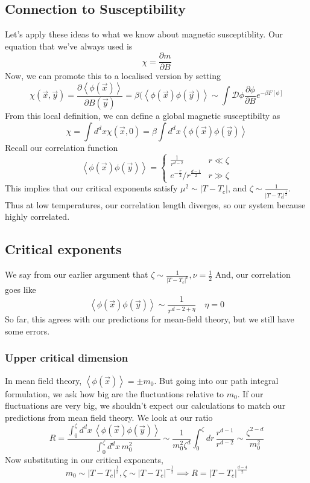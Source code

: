 \documentclass[11pt, oneside]{article}   	%
\begin{document}
\subsection{Connection to Susceptibility} 
Let's apply these ideas to what we know about magnetic susceptiblity. 
Our equation that we've always used is 
\[
 \chi = \frac{\partial  m}{\partial   B } 
\] Now, we can promote this to a localised 
version by setting 
\[
	\chi ( \vec{x}, \vec{y} ) = \frac{\partial  \left< \phi ( \vec{x} )  \right> }{\partial B ( \vec{y} ) } = \beta ( \left< \phi ( \vec{x} ) \phi ( \vec{y} )  \right> \sim \int \mathcal{ D } \phi \frac{\partial \phi }{\partial  B } e^{  - \beta F [ \phi ] }  
\] From this local 
definition, we can define a global magnetic 
susceptibilty as 
\[
	\chi = \int d^ d x \chi ( \vec{x}, 0 ) = \beta \int d^ d x \left< \phi ( \vec{x} ) \phi ( \vec{y} )  \right>
\]
Recall our correlation function 
\[
	\left< \phi ( \vec{x} ) \phi ( \vec{y} )  \right> = \begin{cases}
		\frac{1}{r^{ d - 2}  } & r \ll \zeta \\
		e^{ - \frac{r}{2 } } / r ^{ \frac{ d -1 }{ 2 } } & r \gg \zeta
	\end{cases}
\] This implies that our critical exponents satisfy $ \mu ^ 2 \sim | T - T_{ c } | $, 
and $ \zeta \sim \frac{1}{ | T - T_{ c } | ^{ \frac{1}{ 2 }  } } $. 
Thus at low temperatures, our correlation length diverges, so 
our system because highly correlated. 

\subsection{Critical exponents} 
We say from our earlier argument that $ \zeta \sim \frac{1}{ | T - T _ c |^ \nu } , \nu = \frac{1}{2 } $ And, our correlation goes like
\[
	\left< \phi ( \vec{x} ) \phi ( \vec{y} )  \right> \sim \frac{1}{ r^{ d - 2 + \eta }} \quad \eta  =0 
\] So far, this agrees with our predictions for mean-field theory, 
but we still have some errors. 

\subsubsection{Upper critical dimension} 
In mean field theory, $ \left< \phi ( \vec{x} )  \right> = \pm m_0 $. 
But going into our path integral formulation, 
we ask how big are the fluctuations relative to $ m_0 $. 
If our fluctuations are very big, we shouldn't
expect our calculations to match our 
predictions from mean field theory. 
We look at our ratio
\[
	R = \frac{\int _ 0 ^\zeta d^ d x \, \left< \phi ( \vec{x} ) \phi ( \vec{y} )   \right>  }{\int_0 ^ \zeta d^ d x \, m_0 ^ 2 } \sim \frac{1}{m_0 ^ 2 \zeta ^ d } \int_0 ^ \zeta dr \, \frac{ r^{ d- 1} }{r^{ d - 2 } } \sim \frac{ \zeta^{ 2 -d } }{m_0 ^ 2 }
\]  
Now substituting in our critical exponents, 
\[
 m_0 \sim | T - T_c |^{ \frac{1}{ 2 } }, \zeta \sim | T -T _c|^{- \frac{1}{2 } } \implies R = | T -T_c | ^{ \frac{ d - 4 }{ 2 } }
\]
\end{document}
